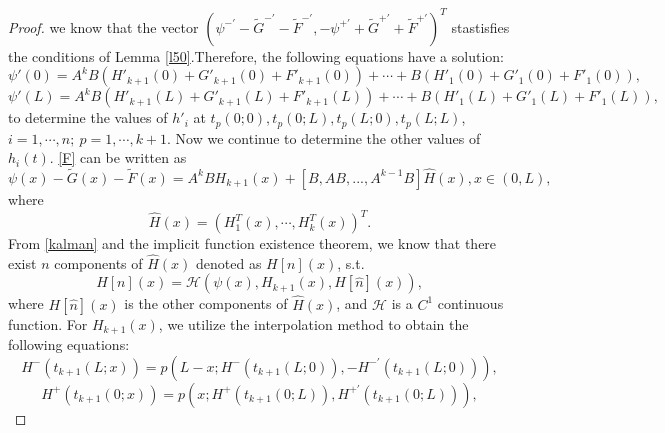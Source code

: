 \documentclass[a4paper,reqno,11pt]{amsart}
\numberwithin{equation}{section} %
\begin{document}
\begin{proof}
we know that the vector $(\psi ^{-\prime}-\tilde{G}^{-\prime}-\tilde{F}^{-\prime},-\psi ^{+\prime}+\tilde{G}^{+\prime}+\tilde{F}^{+\prime})^T$ stastisfies the conditions of Lemma \ref{l50}.Therefore, the following equations have a solution:
\begin{equation}\label{c1 continuity at 0}
	\psi  '\left( 0 \right)=A^kB(H'_{k+1}\left( 0\right)+G'_{k+1}\left( 0 \right)+F'_{k+1}\left( 0 \right)) +\cdots + B(H'_1\left( 0 \right)+G'_1\left( 0 \right)+F'_1\left( 0 \right)) ,
\end{equation}
\begin{equation}\label{c1 continuity at L}
	\psi  '\left( L \right)=A^kB(H'_{k+1}\left( L \right)+G'_{k+1}\left( L \right)+F'_{k+1}\left( L \right)) +\cdots + B(H'_1\left( L \right)+G'_1\left( L \right)+F'_1\left( L \right)) ,
\end{equation}
to determine the values of $h'_i$ at $t_p(0;0),t_p(0;L),t_p(L;0),t_p(L;L)$,$i=1,\cdots,n;\ p=1,\cdots,k+1$.
Now we continue to determine the other values of $h_i(t)$. \eqref{F} can be written as
\begin{equation}\label{G}
\psi \left( x \right) -\tilde{G}\left( x \right) -\tilde{F}\left( x \right) =A^kBH_{k+1}\left( x \right) +\left[ B,AB,...,A^{k-1}B \right] \hat{H}(x), x\in \left( 0,L \right) ,
\end{equation}
where 
$$
\hat{H}(x)=\left( H^T_1\left( x \right) ,\cdots ,H^T_k\left( x \right) \right)^T .
$$
From \eqref{kalman} and the implicit function existence theorem, we know that there exist $n$ components of $\hat{H}(x)$ denoted as $H[n](x) $, s.t.
\begin{equation}\label{H}
H\left[ n \right] \left( x \right) =\mathcal{H} \left( \psi\left( x \right) ,H_{k+1}\left( x \right) ,H\left[ \hat{n} \right] \left( x \right) \right) ,
\end{equation}
where $H\left[ \hat{n} \right] \left( x \right)$ is the other components of $\hat{H}(x)$, and $\mathcal{H}$ is a $C^1$ continuous function. For $H_{k+1}\left( x \right) $, we utilize the interpolation method to obtain the following equations:
\begin{equation}\label{polynomial k+1 r}
H^-\left( t_{k+1}\left( L;x \right) \right) =p\left( L-x;H^-\left( t_{k+1}\left( L;0 \right) \right) ,-H^{- \prime}\left( t_{k+1}\left( L;0 \right) \right) \right) ,
\end{equation}
\begin{equation}\label{polynomial k+1 s}
	H^+\left( t_{k+1}\left( 0;x \right) \right) =p\left( x;H^+\left( t_{k+1}\left( 0;L \right) \right) ,H^{+ \prime}\left( t_{k+1}\left( 0;L \right) \right) \right) ,

\end{equation}
\end{proof}
\end{document}
